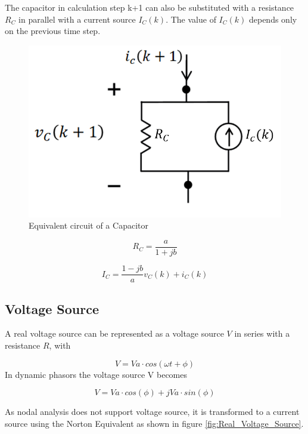 The capacitor in calculation step k+1 can also be substituted with a resistance $R_C$ in parallel with a current source $I_C(k)$. The value of $I_C(k)$ depends only on the previous time step.

\begin{figure}[ht]
	\centering
	\includegraphics[scale=0.6]{img/Capacitor.png} 
	\caption{Equivalent circuit of a Capacitor}
	\label{fig:Capacitor}
\end{figure}

\begin{equation}
	R_C = \frac{a}{1+jb}
\end{equation}

\begin{equation}
	I_C = \frac{1-jb}{a} v_C(k) + i_C(k)
\end{equation}

\subsection{Voltage Source}

A real voltage source can be represented as a voltage source $V$ in series with a resistance $R$, with

\begin{equation}
V=Va \cdot cos(\omega t + \phi)
\end{equation}
In dynamic phasors the voltage source V becomes

\begin{equation}
V = Va \cdot cos (\phi) + jVa \cdot sin(\phi) 
\end{equation}

As nodal analysis does not support voltage source, it is transformed to a current source using the Norton Equivalent as shown in figure \ref{fig:Real_Voltage_Source}.

